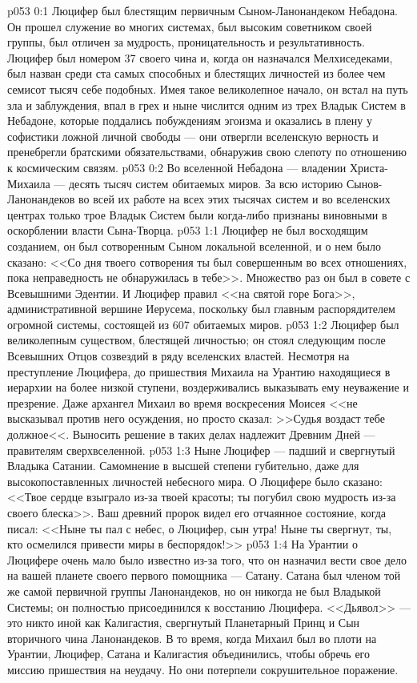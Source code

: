 \vs p053 0:1 Люцифер был блестящим первичным Сыном\hyp{}Ланонандеком Небадона. Он прошел служение во многих системах, был высоким советником своей группы, был отличен за мудрость, проницательность и результативность. Люцифер был номером 37 своего чина и, когда он назначался Мелхиседеками, был назван среди ста самых способных и блестящих личностей из более чем семисот тысяч себе подобных. Имея такое великолепное начало, он встал на путь зла и заблуждения, впал в грех и ныне числится одним из трех Владык Систем в Небадоне, которые поддались побуждениям эгоизма и оказались в плену у софистики ложной личной свободы --- они отвергли вселенскую верность и пренебрегли братскими обязательствами, обнаружив свою слепоту по отношению к космическим связям.
\vs p053 0:2 Во вселенной Небадона --- владении Христа\hyp{}Михаила --- десять тысяч систем обитаемых миров. За всю историю Сынов\hyp{}Ланонандеков во всей их работе на всех этих тысячах систем и во вселенских центрах только трое Владык Систем были когда\hyp{}либо признаны виновными в оскорблении власти Сына\hyp{}Творца.
\vs p053 1:1 Люцифер не был восходящим созданием, он был сотворенным Сыном локальной вселенной, и о нем было сказано: <<Со дня твоего сотворения ты был совершенным во всех отношениях, пока неправедность не обнаружилась в тебе>>. Множество раз он был в совете с Всевышними Эдентии. И Люцифер правил <<на святой горе Бога>>, административной вершине Иерусема, поскольку был главным распорядителем огромной системы, состоящей из 607 обитаемых миров.
\vs p053 1:2 Люцифер был великолепным существом, блестящей личностью; он стоял следующим после Всевышних Отцов созвездий в ряду вселенских властей. Несмотря на преступление Люцифера, до пришествия Михаила на Урантию находящиеся в иерархии на более низкой ступени, воздерживались выказывать ему неуважение и презрение. Даже архангел Михаил во время воскресения Моисея <<не высказывал против него осуждения, но просто сказал: >>Судья воздаст тебе должное<<. Выносить решение в таких делах надлежит Древним Дней --- правителям сверхвселенной.
\vs p053 1:3 Ныне Люцифер --- падший и свергнутый Владыка Сатании. Самомнение в высшей степени губительно, даже для высокопоставленных личностей небесного мира. О Люцифере было сказано: <<Твое сердце взыграло из\hyp{}за твоей красоты; ты погубил свою мудрость из\hyp{}за своего блеска>>. Ваш древний пророк видел его отчаянное состояние, когда писал: <<Ныне ты пал с небес, о Люцифер, сын утра! Ныне ты свергнут, ты, кто осмелился привести миры в беспорядок!>>
\vs p053 1:4 На Урантии о Люцифере очень мало было известно из\hyp{}за того, что он назначил вести свое дело на вашей планете своего первого помощника --- Сатану. Сатана был членом той же самой первичной группы Ланонандеков, но он никогда не был Владыкой Системы; он полностью присоединился к восстанию Люцифера. <<Дьявол>> --- это никто иной как Калигастия, свергнутый Планетарный Принц и Сын вторичного чина Ланонандеков. В то время, когда Михаил был во плоти на Урантии, Люцифер, Сатана и Калигастия объединились, чтобы обречь его миссию пришествия на неудачу. Но они потерпели сокрушительное поражение.
